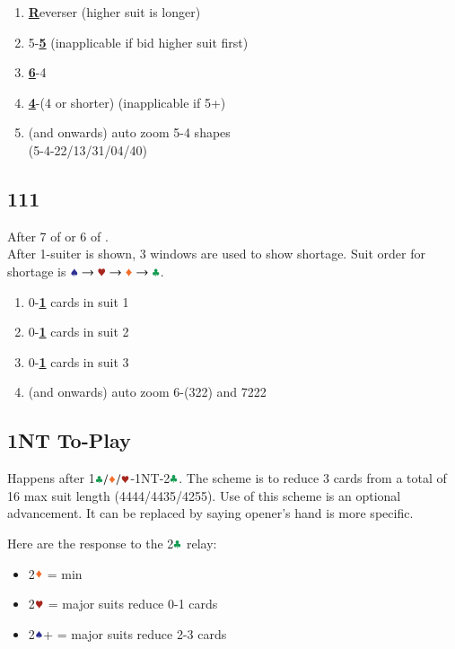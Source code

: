 \documentclass{article}
\newcommand*{\ccc}{\textcolor{ForestGreen}{\clubsuit}}
\newcommand*{\ddd}{\textcolor{Orange}{\vardiamondsuit}}
\newcommand*{\hhh}{\textcolor{Mahogany}{\varheartsuit}}
\newcommand*{\sss}{\textcolor{Blue}{\spadesuit}}
\begin{document}
\begin{multicols}{2}
\begin{enumerate}
    \setlength\itemsep{-0.2em}
    \item \textbf{\underline{R}}everser (higher suit is longer)
    \item 5-\textbf{\underline{5}} (inapplicable if bid higher suit first)
    \item \textbf{\underline{6}}-4
    \item \textbf{\underline{4}}-(4 or shorter) (inapplicable if 5+)
    \item (and onwards) auto zoom 5-4 shapes \\
        (5-4-22/13/31/04/40)
\end{enumerate}

\subsection{111}\label{sec:111}
After 7 of  or 6 of . \\
After 1-suiter is shown, 3 windows are used to show shortage. Suit order for shortage is $\sss \rightarrow \hhh \rightarrow \ddd \rightarrow \ccc$.

\begin{enumerate}
    \setlength\itemsep{-0.2em}
    \item 0-\textbf{\underline{1}} cards in suit 1
    \item 0-\textbf{\underline{1}} cards in suit 2
    \item 0-\textbf{\underline{1}} cards in suit 3
    \item (and onwards) auto zoom 6-(322) and 7222
\end{enumerate}

\subsection{1NT To-Play}\label{sec:1nt-to-play}
Happens after 1$\ccc/\ddd/\hhh$-1NT-2$\ccc$. The scheme is to reduce 3 cards from a total of 16 max suit length (4444/4435/4255). Use of this scheme is an optional advancement. It can be replaced by saying opener's hand is more specific.

\columnbreak

\noindent Here are the response to the 2$\ccc$ relay:
\begin{itemize}
    \setlength\itemsep{-0.2em}
    \item 2$\ddd$ = min
    \item 2$\hhh$ = major suits reduce 0-1 cards
    \item 2$\sss$+ = major suits reduce 2-3 cards
\end{itemize}


\end{multicols}
\end{document}
